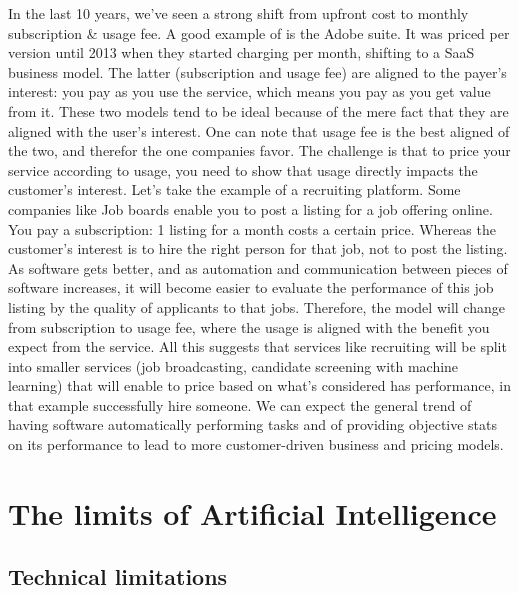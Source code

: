 \documentclass[12pt]{article}
\begin{document}
 In the last 10 years, we've seen a strong shift from upfront cost to monthly
subscription \& usage fee. A good example of is the Adobe suite. It was priced
per version until 2013 when they started charging per month, shifting to a SaaS
business model. The latter (subscription and usage fee) are aligned to the
payer's interest: you pay as you use the service, which means you pay as you
get value from it. These two models tend to be ideal because of the mere fact
that they are aligned with the user's interest. One can note that usage fee is
the best aligned of the two, and therefor the one companies favor. The
challenge is that to price your service according to usage, you need to show
that usage directly impacts the customer's interest. Let's take the example of
a recruiting platform. Some companies like Job boards enable you to post a
listing for a job offering online. You pay a subscription: 1 listing for a
month costs a certain price. Whereas the customer's interest is to hire the
right person for that job, not to post the listing. As software gets better,
and as automation and communication between pieces of software increases, it
will become easier to evaluate the performance of this job listing by the
quality of applicants to that jobs. Therefore, the model will change from
subscription to usage fee, where the usage is aligned with the benefit you
expect from the service. All this suggests that services like recruiting will
be split into smaller services (job broadcasting, candidate screening with
machine learning) that will enable to price based on what's considered has
performance, in that example successfully hire someone. We can expect the
general trend of having software automatically performing tasks and of
providing objective stats on its performance to lead to more customer-driven
business and pricing models.

\pagebreak


\section{The limits of Artificial Intelligence}

\subsection{Technical limitations}
\end{document}
